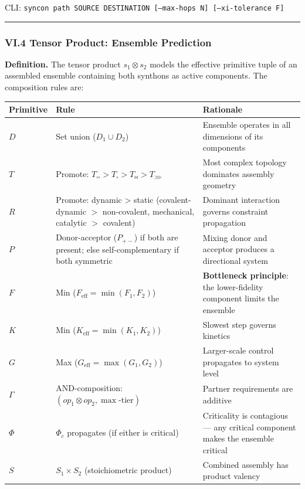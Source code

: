 \documentclass[12pt,a4paper]{article}
\begin{document}
CLI: \texttt{syncon path SOURCE DESTINATION {[}--max-hops N{]} {[}--xi-tolerance F{]}}

\begin{center}
\rule{0.5\textwidth}{0.4pt}
\end{center}

\subsubsection{VI.4 Tensor Product: Ensemble Prediction}

\textbf{Definition.} The tensor product $s_1 \otimes s_2$ models the effective primitive tuple of an assembled ensemble containing both synthons as active components. The composition rules are:

\begin{table}[htbp]
\centering
\small
{}
\begin{tabularx}{\textwidth}{>{\centering\arraybackslash}X >{\centering\arraybackslash}X >{\centering\arraybackslash}X}
\toprule
\rowcolor{gray!25}\textbf{Primitive} & \textbf{Rule} & \textbf{Rationale} \\
\midrule
\rowcolors{1}{white}{gray!10}
$D$ & Set union ($D_1 \cup D_2$) & Ensemble operates in all dimensions of its components \\
$T$ & Promote: $T_{\square\square} > T_{\square} > T_{\bowtie} > T_{\ggg}$ & Most complex topology dominates assembly geometry \\
$R$ & Promote: dynamic \textgreater{} static (covalent-dynamic $>$ non-covalent, mechanical, catalytic $>$ covalent) & Dominant interaction governs constraint propagation \\
$P$ & Donor-acceptor ($P_{+-}$) if both are present; else self-complementary if both symmetric & Mixing donor and acceptor produces a directional system \\
$F$ & Min ($F_{\text{eff}} = \min(F_1, F_2)$) & \textbf{Bottleneck principle}: the lower-fidelity component limits the ensemble \\
$K$ & Min ($K_{\text{eff}} = \min(K_1, K_2)$) & Slowest step governs kinetics \\
$G$ & Max ($G_{\text{eff}} = \max(G_1, G_2)$) & Larger-scale control propagates to system level \\
$\Gamma$ & AND-composition: $(op_1 \otimes op_2, \max\text{-tier})$ & Partner requirements are additive \\
$\Phi$ & $\Phi_c$ propagates (if either is critical) & Criticality is contagious --- any critical component makes the ensemble critical \\
$S$ & $S_1 \times S_2$ (stoichiometric product) & Combined assembly has product valency \\
\bottomrule
\end{tabularx}
\end{table}
\end{document}
